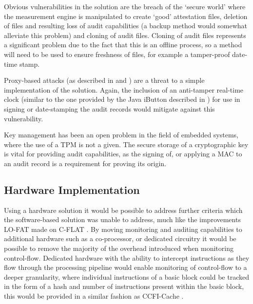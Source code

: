 Obvious vulnerabilities in the solution are the breach of the `secure world' where the measurement engine is manipulated to create `good' attestation files, deletion of files and resulting loss of audit capabilities (a backup method would somewhat alleviate this problem) and cloning of audit files. Cloning of audit files represents a significant problem due to the fact that this is an offline process, so a method will need to be used to ensure freshness of files, for example a tamper-proof date-time stamp.

Proxy-based attacks (as described in \cite{Seshadri2007} and \cite{Li2011}) are a threat to a simple implementation of the solution. Again, the inclusion of an anti-tamper real-time clock (similar to the one provided by the Java iButton described in \cite{Chong2003}) for use in signing or date-stamping the audit records would mitigate against this vulnerability.

Key management has been an open problem in the field of embedded systems, where the use of a TPM is not a given. The secure storage of a cryptographic key is vital for providing audit capabilities, as the signing of, or applying a MAC to an audit record is a requirement for proving its origin.

\subsection{Hardware Implementation}
Using a hardware solution it would be possible to address further criteria which the software-based solution was unable to address, much like the improvements LO-FAT\cite{Dessouky2017} made on C-FLAT \cite{Abera2016}. By moving monitoring and auditing capabilities to additional hardware such as a co-processor, or dedicated circuitry it would be possible to remove the majority of the overhead introduced when monitoring control-flow. Dedicated hardware with the ability to intercept instructions as they flow through the processing pipeline would enable monitoring of control-flow to a deeper granularity, where individual instructions of a basic block could be tracked in the form of a hash and number of instructions present within the basic block, this would be provided in a similar fashion as CCFI-Cache \cite{Danger2018}.
